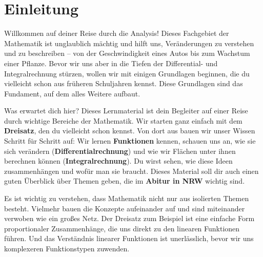 \section{Einleitung}

Willkommen auf deiner Reise durch die Analysis! Dieses Fachgebiet der Mathematik ist unglaublich mächtig und hilft uns, Veränderungen zu verstehen und zu beschreiben – von der Geschwindigkeit eines Autos bis zum Wachstum einer Pflanze. Bevor wir uns aber in die Tiefen der Differential- und Integralrechnung stürzen, wollen wir mit einigen Grundlagen beginnen, die du vielleicht schon aus früheren Schuljahren kennst. Diese Grundlagen sind das Fundament, auf dem alles Weitere aufbaut.

\begin{merksatzumgebung}[Zielsetzung]{Was erwartet dich hier?}
Dieses Lernmaterial ist dein Begleiter auf einer Reise durch wichtige Bereiche der Mathematik. Wir starten ganz einfach mit dem \textbf{Dreisatz}, den du vielleicht schon kennst. Von dort aus bauen wir unser Wissen Schritt für Schritt auf: Wir lernen \textbf{Funktionen} kennen, schauen uns an, wie sie sich verändern (\textbf{Differentialrechnung}) und wie wir Flächen unter ihnen berechnen können (\textbf{Integralrechnung}). Du wirst sehen, wie diese Ideen zusammenhängen und wofür man sie braucht.
Dieses Material soll dir auch einen guten Überblick über Themen geben, die im \textbf{Abitur in NRW} wichtig sind.
\end{merksatzumgebung}

Es ist wichtig zu verstehen, dass Mathematik nicht nur aus isolierten Themen besteht. Vielmehr bauen die Konzepte aufeinander auf und sind miteinander verwoben wie ein großes Netz. Der Dreisatz zum Beispiel ist eine einfache Form proportionaler Zusammenhänge, die uns direkt zu den linearen Funktionen führen. Und das Verständnis linearer Funktionen ist unerlässlich, bevor wir uns komplexeren Funktionstypen zuwenden.


